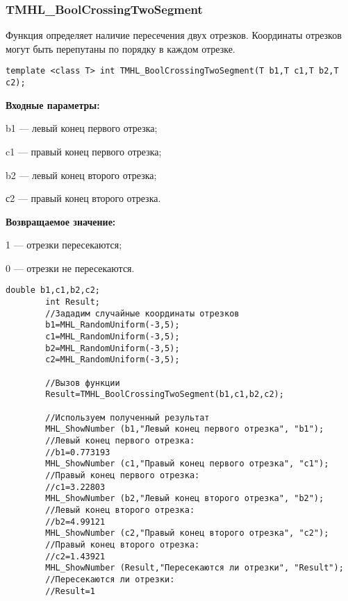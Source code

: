 \documentclass[a4paper,12pt]{article}
\begin{document}
\subsubsection{TMHL\_BoolCrossingTwoSegment}\label{TMHL_BoolCrossingTwoSegment}

Функция определяет наличие пересечения двух отрезков. Координаты отрезков могут быть перепутаны по порядку в каждом отрезке.


\begin{lstlisting}[label=code_syntax_TMHL_BoolCrossingTwoSegment,caption=Синтаксис]
template <class T> int TMHL_BoolCrossingTwoSegment(T b1,T c1,T b2,T c2);
\end{lstlisting}

\textbf{Входные параметры:}  
 
b1 --- левый конец первого отрезка;
 
c1 --- правый конец первого отрезка;
 
b2 --- левый конец второго отрезка;
 
с2 --- правый конец второго отрезка.

\textbf{Возвращаемое значение:}
 
1 --- отрезки пересекаются;
 
0 --- отрезки не пересекаются.


\begin{lstlisting}[label=code_use_TMHL_BoolCrossingTwoSegment,caption=Пример использования]
        double b1,c1,b2,c2;
        int Result;
        //Зададим случайные координаты отрезков
        b1=MHL_RandomUniform(-3,5);
        c1=MHL_RandomUniform(-3,5);
        b2=MHL_RandomUniform(-3,5);
        c2=MHL_RandomUniform(-3,5);

        //Вызов функции
        Result=TMHL_BoolCrossingTwoSegment(b1,c1,b2,c2);

        //Используем полученный результат
        MHL_ShowNumber (b1,"Левый конец первого отрезка", "b1");
        //Левый конец первого отрезка:
        //b1=0.773193
        MHL_ShowNumber (c1,"Правый конец первого отрезка", "c1");
        //Правый конец первого отрезка:
        //c1=3.22803
        MHL_ShowNumber (b2,"Левый конец второго отрезка", "b2");
        //Левый конец второго отрезка:
        //b2=4.99121
        MHL_ShowNumber (c2,"Правый конец второго отрезка", "c2");
        //Правый конец второго отрезка:
        //c2=1.43921
        MHL_ShowNumber (Result,"Пересекаются ли отрезки", "Result");
        //Пересекаются ли отрезки:
        //Result=1
\end{lstlisting}
\end{document}
